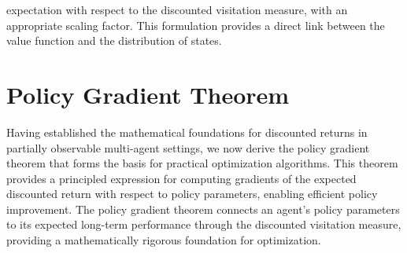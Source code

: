 expectation with respect to the discounted visitation measure, with an appropriate
scaling factor. This formulation provides a direct link between the value
function and the distribution of states.

\section{Policy Gradient Theorem}
Having established the mathematical foundations for discounted returns in
partially observable multi-agent settings, we now derive the policy gradient theorem
that forms the basis for practical optimization algorithms. This theorem
provides a principled expression for computing gradients of the expected
discounted return with respect to policy parameters, enabling efficient policy improvement.
The policy gradient theorem connects an agent's policy parameters to its
expected long-term performance through the discounted visitation measure, providing
a mathematically rigorous foundation for optimization.

